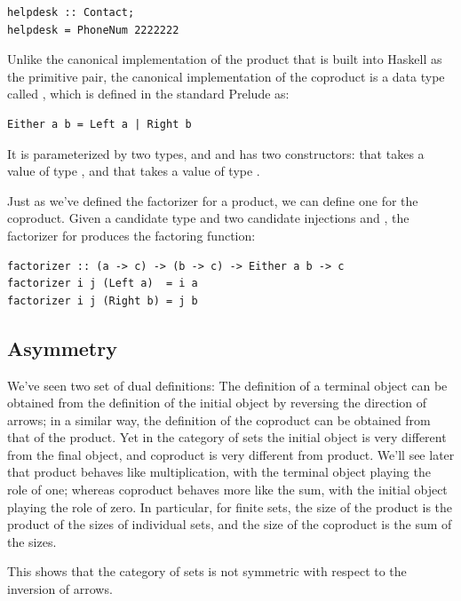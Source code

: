 \begin{verbatim}
helpdesk :: Contact;
helpdesk = PhoneNum 2222222
\end{verbatim}

\noindent
Unlike the canonical implementation of the product that is built into
Haskell as the primitive pair, the canonical implementation of the
coproduct is a data type called , which is defined in the
standard Prelude as:

\begin{verbatim}
Either a b = Left a | Right b
\end{verbatim}

\noindent
It is parameterized by two types,  and  and has two
constructors:  that takes a value of type , and
 that takes a value of type .

Just as we've defined the factorizer for a product, we can define one
for the coproduct. Given a candidate type  and two candidate
injections  and , the factorizer for 
produces the factoring function:

\begin{verbatim}
factorizer :: (a -> c) -> (b -> c) -> Either a b -> c
factorizer i j (Left a)  = i a
factorizer i j (Right b) = j b
\end{verbatim}

\subsection{Asymmetry}\label{asymmetry}

We've seen two set of dual definitions: The definition of a terminal
object can be obtained from the definition of the initial object by
reversing the direction of arrows; in a similar way, the definition of
the coproduct can be obtained from that of the product. Yet in the
category of sets the initial object is very different from the final
object, and coproduct is very different from product. We'll see later
that product behaves like multiplication, with the terminal object
playing the role of one; whereas coproduct behaves more like the sum,
with the initial object playing the role of zero. In particular, for
finite sets, the size of the product is the product of the sizes of
individual sets, and the size of the coproduct is the sum of the sizes.

This shows that the category of sets is not symmetric with respect to
the inversion of arrows.

